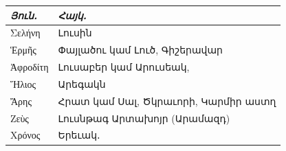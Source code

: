 \documentclass{article}
\begin{document}
\begin{table}[H]
    \centering
    \arm
    \bfseries
    \small
    \begin{tabular}{l l}
        \emph{Յուն․}   &  \emph{Հայկ․}                              \\ \hline
         Σελήνη    &  Լուսին                               \\ 
         Ἑρμῆς     &  Փայլածու կամ Լուծ, Գիշերավար         \\
         Ἀφροδίτη  &  Լուսաբեր կամ Արուսեակ,               \\
         Ἥλιος     &  Արեգակն                              \\
         Ἄρης      &  Հրատ կամ Սալ, Ծկրաւորի, Կարմիր աստղ  \\
         Ζεὺς      &  Լուսնթագ Արտախոյր (Արամազդ)          \\
         Χρόνος    &  Երեւակ․ \\
    \end{tabular}
\end{table}
\end{document}
